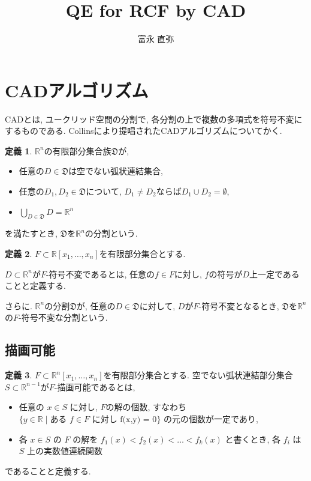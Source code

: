 \documentclass[dvipdfmx]{jsarticle}
\newcommand{\R}{\mathbb{R}}
\theoremstyle{definition}
\newtheorem{definition}{定義}[section]
\begin{document}
\title{QE for RCF by CAD}
\author{富永 直弥}
\maketitle

\section{CADアルゴリズム}
CADとは, ユークリッド空間の分割で, 各分割の上で複数の多項式を符号不変にするものである. Collinsにより提唱されたCADアルゴリズムについてかく. 
\begin{definition}
$\R^n$の有限部分集合族$\mathfrak{D}$が, 

\begin{itemize}
	\item 任意の$D \in \mathfrak{D}$は空でない弧状連結集合, 
	\item 任意の$D_1, D_2 \in \mathfrak{D}$について, $D_1 \neq D_2$ならば$D_1 \cup D_2 = \emptyset$,
	\item $\bigcup_{D \in \mathfrak{D}}D = \R^n$
\end{itemize}

を満たすとき, $\mathfrak{D}$を$\R^n$の分割という.
\end{definition}

\begin{definition}
$F \subset \R[x_1, \dots, x_n]$を有限部分集合とする.

$D \subset \R^n$が$F$-符号不変であるとは, 任意の$f \in F$に対し, $f$の符号が$D$上一定であることと定義する.

さらに. $\R^n$の分割$\mathfrak{D}$が, 任意の$D \in \mathfrak{D}$に対して, $D$が$F$-符号不変となるとき, $\mathfrak{D}$を$\R^n$の$F$-符号不変な分割という.
\end{definition}

\subsection{描画可能}
\begin{definition}
$F \subset \R^n[x_1, \dots, x_n]$を有限部分集合とする. 空でない弧状連結部分集合$S \subset \R^{n-1}$が$F$-描画可能であるとは, 
\begin{itemize}
	\item 任意の $ x \in S $ に対し, $ F $の解の個数, すなわち $ \{y \in \mathbb{R} \mid \text{ある $f \in F$ に対し f(x,y) = 0} \} $ の元の個数が一定であり, 
	\item 各 $ x \in S $ の $ F $ の解を $ f_1(x) < f_2(x) < \dots < f_k(x) $ と書くとき, 各 $ f_i $ は $ S $ 上の実数値連続関数
\end{itemize}
であることと定義する.
\end{definition}
\end{document}

